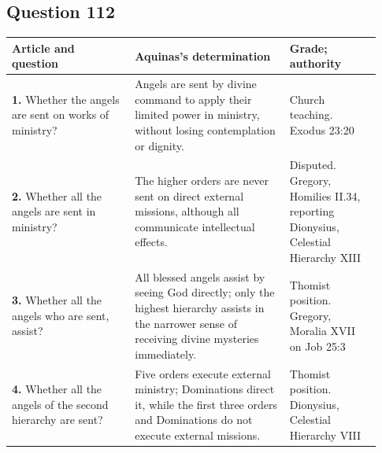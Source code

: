\subsection{Question 112}
\begin{longtable}{@{}>{\raggedright\arraybackslash}p{0.31\linewidth}>{\raggedright\arraybackslash}p{0.39\linewidth}>{\raggedright\arraybackslash}p{0.23\linewidth}@{}}
\toprule
Article and question & Aquinas's determination & Grade; authority\\
\midrule\endhead
\textbf{1.} Whether the angels are sent on works of ministry? & Angels are sent by divine command to apply their limited power in ministry, without losing contemplation or dignity. & Church teaching. Exodus 23:20\\
\textbf{2.} Whether all the angels are sent in ministry? & The higher orders are never sent on direct external missions, although all communicate intellectual effects. & Disputed. Gregory, Homilies II.34, reporting Dionysius, Celestial Hierarchy XIII\\
\textbf{3.} Whether all the angels who are sent, assist? & All blessed angels assist by seeing God directly; only the highest hierarchy assists in the narrower sense of receiving divine mysteries immediately. & Thomist position. Gregory, Moralia XVII on Job 25:3\\
\textbf{4.} Whether all the angels of the second hierarchy are sent? & Five orders execute external ministry; Dominations direct it, while the first three orders and Dominations do not execute external missions. & Thomist position. Dionysius, Celestial Hierarchy VIII\\
\bottomrule
\end{longtable}
